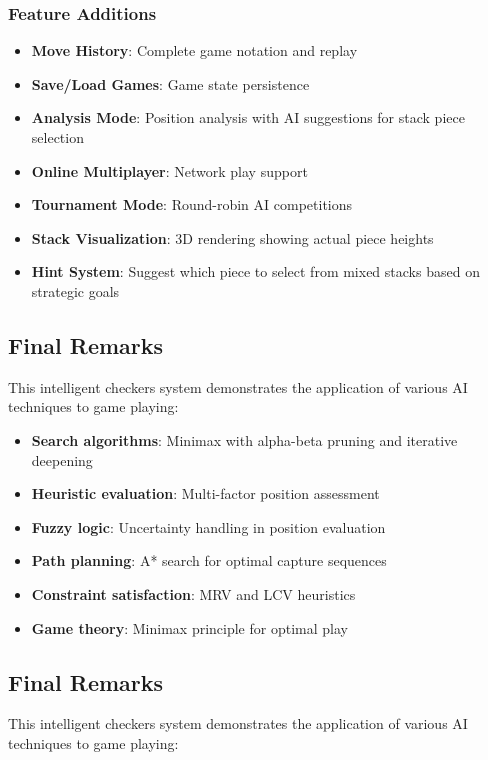 \documentclass[12pt,a4paper]{article}
\begin{document}
\subsubsection{Feature Additions}
\begin{itemize}
    \item \textbf{Move History}: Complete game notation and replay
    \item \textbf{Save/Load Games}: Game state persistence
    \item \textbf{Analysis Mode}: Position analysis with AI suggestions for stack piece selection
    \item \textbf{Online Multiplayer}: Network play support
    \item \textbf{Tournament Mode}: Round-robin AI competitions
    \item \textbf{Stack Visualization}: 3D rendering showing actual piece heights
    \item \textbf{Hint System}: Suggest which piece to select from mixed stacks based on strategic goals
\end{itemize}

\subsection{Final Remarks}

This intelligent checkers system demonstrates the application of various AI techniques to game playing:
\begin{itemize}
    \item \textbf{Search algorithms}: Minimax with alpha-beta pruning and iterative deepening
    \item \textbf{Heuristic evaluation}: Multi-factor position assessment
    \item \textbf{Fuzzy logic}: Uncertainty handling in position evaluation
    \item \textbf{Path planning}: A* search for optimal capture sequences
    \item \textbf{Constraint satisfaction}: MRV and LCV heuristics
    \item \textbf{Game theory}: Minimax principle for optimal play
\end{itemize}

\subsection{Final Remarks}

This intelligent checkers system demonstrates the application of various AI techniques to game playing:
\end{document}
